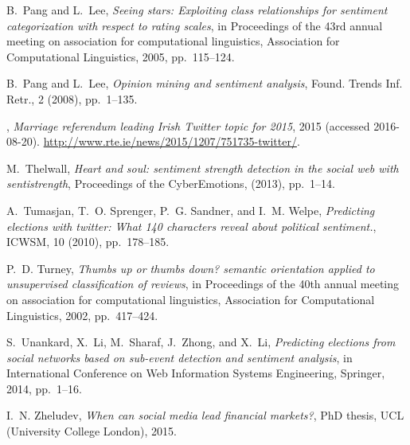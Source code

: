 \documentclass{article}
\begin{document}
\begin{thebibliography}{10}
{\sc B.~Pang and L.~Lee}, {\em Seeing stars: Exploiting class relationships for
  sentiment categorization with respect to rating scales}, in Proceedings of
  the 43rd annual meeting on association for computational linguistics,
  Association for Computational Linguistics, 2005, pp.~115--124.

{\sc B.~Pang and L.~Lee}, {\em Opinion mining and sentiment analysis}, Found.
  Trends Inf. Retr., 2 (2008), pp.~1--135.

{}, {\em Marriage referendum leading {I}rish Twitter topic for
  2015}, 2015 (accessed 2016-08-20).
\newblock \url{http://www.rte.ie/news/2015/1207/751735-twitter/}.

{\sc M.~Thelwall}, {\em Heart and soul: sentiment strength detection in the
  social web with sentistrength}, Proceedings of the CyberEmotions,  (2013),
  pp.~1--14.

{\sc A.~Tumasjan, T.~O. Sprenger, P.~G. Sandner, and I.~M. Welpe}, {\em
  Predicting elections with twitter: What 140 characters reveal about political
  sentiment.}, ICWSM, 10 (2010), pp.~178--185.

{\sc P.~D. Turney}, {\em Thumbs up or thumbs down? semantic orientation applied
  to unsupervised classification of reviews}, in Proceedings of the 40th annual
  meeting on association for computational linguistics, Association for
  Computational Linguistics, 2002, pp.~417--424.

{\sc S.~Unankard, X.~Li, M.~Sharaf, J.~Zhong, and X.~Li}, {\em Predicting
  elections from social networks based on sub-event detection and sentiment
  analysis}, in International Conference on Web Information Systems
  Engineering, Springer, 2014, pp.~1--16.

{\sc I.~N. Zheludev}, {\em When can social media lead financial markets?}, PhD
  thesis, UCL (University College London), 2015.

\end{thebibliography}
\end{document}
